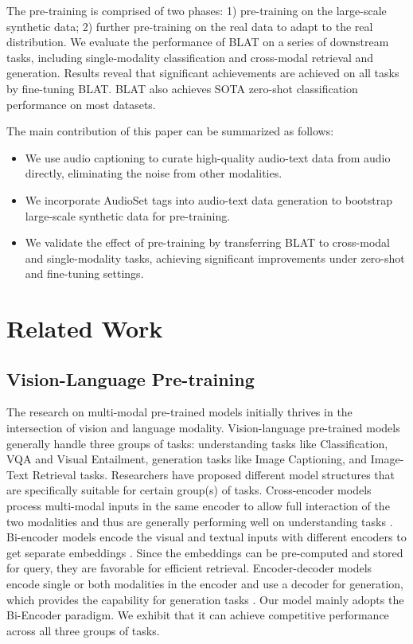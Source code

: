\documentclass[sigconf]{acmart}
\begin{document}
The pre-training is comprised of two phases: 1) pre-training on the large-scale synthetic data; 2) further pre-training on the real data to adapt to the real distribution.
We evaluate the performance of BLAT on a series of downstream tasks, 
including single-modality classification and cross-modal retrieval and 
generation.  Results reveal that significant achievements are achieved 
on all tasks by fine-tuning BLAT.
BLAT also achieves SOTA zero-shot classification performance on most datasets.

The main contribution of this paper can be summarized as follows:
\begin{itemize}
    \item We use audio captioning to curate high-quality audio-text data from audio directly, eliminating the noise from other modalities.
    \item We incorporate AudioSet tags into audio-text data generation to bootstrap large-scale synthetic data for pre-training.
    \item We validate the effect of pre-training by transferring BLAT to cross-modal and single-modality tasks, achieving significant improvements under zero-shot and fine-tuning settings.
\end{itemize}

\section{Related Work}

\subsection{Vision-Language Pre-training}
The research on multi-modal pre-trained models initially thrives in the intersection of vision and language modality. 
Vision-language pre-trained models generally handle three groups of tasks: understanding tasks like Classification, VQA and Visual Entailment, generation tasks like Image Captioning, and Image-Text Retrieval tasks.
Researchers have proposed different model structures that are specifically suitable for certain group(s) of tasks. 
Cross-encoder models process multi-modal inputs in the same encoder to allow full interaction of the two modalities and thus are generally performing well on understanding tasks \citep{chen2020uniter,li2020oscar}. 
Bi-encoder models encode the visual and textual inputs with different encoders to get separate embeddings  \citep{radford2021learning,jia2021scaling}.
Since the embeddings can be pre-computed and stored for query, they are favorable for efficient retrieval. 
Encoder-decoder models encode single or both modalities in the encoder and use a decoder for generation, which provides the capability for generation tasks \citep{wang2021simvlm,wang2022unifying}.
Our model mainly adopts the Bi-Encoder paradigm.
We exhibit that it can achieve competitive performance across all three groups of tasks.
\end{document}
